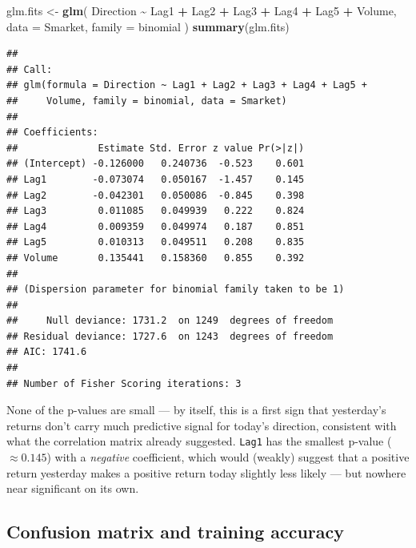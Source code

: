 \documentclass[
  11pt,
]{article}
\newenvironment{Shaded}{\begin{snugshade}}{\end{snugshade}}
\newcommand{\AttributeTok}[1]{\textcolor[rgb]{0.13,0.29,0.53}{#1}}
\newcommand{\FloatTok}[1]{\textcolor[rgb]{0.00,0.00,0.81}{#1}}
\newcommand{\FunctionTok}[1]{\textcolor[rgb]{0.13,0.29,0.53}{\textbf{#1}}}
\newcommand{\NormalTok}[1]{#1}
\newcommand{\OtherTok}[1]{\textcolor[rgb]{0.56,0.35,0.01}{#1}}
\newcommand{\SpecialCharTok}[1]{\textcolor[rgb]{0.81,0.36,0.00}{\textbf{#1}}}
\newcommand{\StringTok}[1]{\textcolor[rgb]{0.31,0.60,0.02}{#1}}
\begin{document}
\begin{Shaded}
\begin{Highlighting}[]
\NormalTok{glm.fits }\OtherTok{\textless{}{-}} \FunctionTok{glm}\NormalTok{(}
\NormalTok{  Direction }\SpecialCharTok{\textasciitilde{}}\NormalTok{ Lag1 }\SpecialCharTok{+}\NormalTok{ Lag2 }\SpecialCharTok{+}\NormalTok{ Lag3 }\SpecialCharTok{+}\NormalTok{ Lag4 }\SpecialCharTok{+}\NormalTok{ Lag5 }\SpecialCharTok{+}\NormalTok{ Volume,}
  \AttributeTok{data =}\NormalTok{ Smarket, }\AttributeTok{family =}\NormalTok{ binomial}
\NormalTok{)}
\FunctionTok{summary}\NormalTok{(glm.fits)}
\end{Highlighting}
\end{Shaded}

\begin{verbatim}
## 
## Call:
## glm(formula = Direction ~ Lag1 + Lag2 + Lag3 + Lag4 + Lag5 + 
##     Volume, family = binomial, data = Smarket)
## 
## Coefficients:
##              Estimate Std. Error z value Pr(>|z|)
## (Intercept) -0.126000   0.240736  -0.523    0.601
## Lag1        -0.073074   0.050167  -1.457    0.145
## Lag2        -0.042301   0.050086  -0.845    0.398
## Lag3         0.011085   0.049939   0.222    0.824
## Lag4         0.009359   0.049974   0.187    0.851
## Lag5         0.010313   0.049511   0.208    0.835
## Volume       0.135441   0.158360   0.855    0.392
## 
## (Dispersion parameter for binomial family taken to be 1)
## 
##     Null deviance: 1731.2  on 1249  degrees of freedom
## Residual deviance: 1727.6  on 1243  degrees of freedom
## AIC: 1741.6
## 
## Number of Fisher Scoring iterations: 3
\end{verbatim}

None of the p-values are small --- by itself, this is a first sign that
yesterday's returns don't carry much predictive signal for today's
direction, consistent with what the correlation matrix already
suggested. \texttt{Lag1} has the smallest p-value (\(\approx 0.145\))
with a \emph{negative} coefficient, which would (weakly) suggest that a
positive return yesterday makes a positive return today slightly less
likely --- but nowhere near significant on its own.

\subsection{Confusion matrix and training
accuracy}\label{confusion-matrix-and-training-accuracy}

\begin{Shaded}
\end{Shaded}
\end{document}

